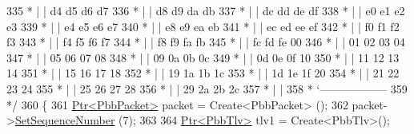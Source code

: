 \begin{DoxyCode}
335 \textcolor{comment}{         * |    |                                            d4  d5  d6  d7}
336 \textcolor{comment}{         * |    |                                            d8  d9  da  db}
337 \textcolor{comment}{         * |    |                                            dc  dd  de  df}
338 \textcolor{comment}{         * |    |                                            e0  e1  e2  e3}
339 \textcolor{comment}{         * |    |                                            e4  e5  e6  e7}
340 \textcolor{comment}{         * |    |                                            e8  e9  ea  eb}
341 \textcolor{comment}{         * |    |                                            ec  ed  ee  ef}
342 \textcolor{comment}{         * |    |                                            f0  f1  f2  f3}
343 \textcolor{comment}{         * |    |                                            f4  f5  f6  f7}
344 \textcolor{comment}{         * |    |                                            f8  f9  fa  fb}
345 \textcolor{comment}{         * |    |                                            fc  fd  fe  00}
346 \textcolor{comment}{         * |    |                                            01  02  03  04}
347 \textcolor{comment}{         * |    |                                            05  06  07  08}
348 \textcolor{comment}{         * |    |                                            09  0a  0b  0c}
349 \textcolor{comment}{         * |    |                                            0d  0e  0f  10}
350 \textcolor{comment}{         * |    |                                            11  12  13  14}
351 \textcolor{comment}{         * |    |                                            15  16  17  18}
352 \textcolor{comment}{         * |    |                                            19  1a  1b  1c}
353 \textcolor{comment}{         * |    |                                            1d  1e  1f  20}
354 \textcolor{comment}{         * |    |                                            21  22  23  24}
355 \textcolor{comment}{         * |    |                                            25  26  27  28}
356 \textcolor{comment}{         * |    |                                            29  2a  2b  2c}
357 \textcolor{comment}{         * |    |}
358 \textcolor{comment}{         * `------------------}
359 \textcolor{comment}{   */}
360   \{
361     \hyperlink{classns3_1_1Ptr}{Ptr<PbbPacket>} packet = Create<PbbPacket> ();
362     packet->\hyperlink{classns3_1_1PbbPacket_a7d6a1602be86109760d0f26ff9bbbb8e}{SetSequenceNumber} (7);
363 
364     \hyperlink{classns3_1_1Ptr}{Ptr<PbbTlv>} tlv1 = Create<PbbTlv>();

\end{DoxyCode}
